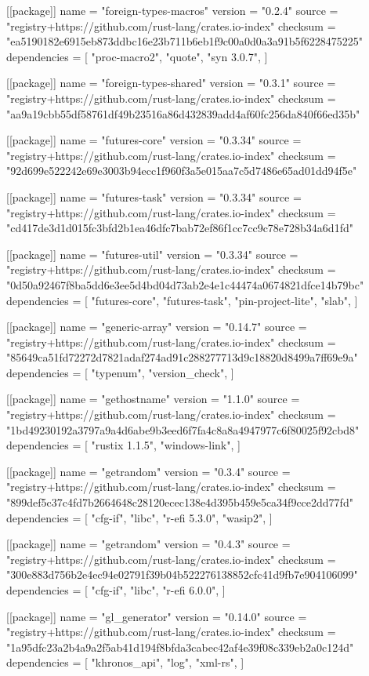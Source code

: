 [[package]]
name = "foreign-types-macros"
version = "0.2.4"
source = "registry+https://github.com/rust-lang/crates.io-index"
checksum = "ea5190182e6915eb873ddbc16e23b711b6eb1f9c00a0d0a3a91b5f6228475225"
dependencies = [
 "proc-macro2",
 "quote",
 "syn 3.0.7",
]

[[package]]
name = "foreign-types-shared"
version = "0.3.1"
source = "registry+https://github.com/rust-lang/crates.io-index"
checksum = "aa9a19cbb55df58761df49b23516a86d432839add4af60fc256da840f66ed35b"

[[package]]
name = "futures-core"
version = "0.3.34"
source = "registry+https://github.com/rust-lang/crates.io-index"
checksum = "92d699e522242e69e3003b94ecc1f960f3a5e015aa7c5d7486e65ad01dd94f5e"

[[package]]
name = "futures-task"
version = "0.3.34"
source = "registry+https://github.com/rust-lang/crates.io-index"
checksum = "cd417de3d1d015fc3bfd2b1ea46dfc7bab72ef86f1cc7cc9c78e728b34a6d1fd"

[[package]]
name = "futures-util"
version = "0.3.34"
source = "registry+https://github.com/rust-lang/crates.io-index"
checksum = "0d50a92467f8ba5dd6e3ee5d4bd04d73ab2e4e1c44474a0674821dfce14b79bc"
dependencies = [
 "futures-core",
 "futures-task",
 "pin-project-lite",
 "slab",
]

[[package]]
name = "generic-array"
version = "0.14.7"
source = "registry+https://github.com/rust-lang/crates.io-index"
checksum = "85649ca51fd72272d7821adaf274ad91c288277713d9c18820d8499a7ff69e9a"
dependencies = [
 "typenum",
 "version_check",
]

[[package]]
name = "gethostname"
version = "1.1.0"
source = "registry+https://github.com/rust-lang/crates.io-index"
checksum = "1bd49230192a3797a9a4d6abe9b3eed6f7fa4c8a8a4947977c6f80025f92cbd8"
dependencies = [
 "rustix 1.1.5",
 "windows-link",
]

[[package]]
name = "getrandom"
version = "0.3.4"
source = "registry+https://github.com/rust-lang/crates.io-index"
checksum = "899def5c37c4fd7b2664648c28120ecec138e4d395b459e5ca34f9cce2dd77fd"
dependencies = [
 "cfg-if",
 "libc",
 "r-efi 5.3.0",
 "wasip2",
]

[[package]]
name = "getrandom"
version = "0.4.3"
source = "registry+https://github.com/rust-lang/crates.io-index"
checksum = "300e883d756b2e4ec94e02791f39b04b522276138852cfc41d9fb7e904106099"
dependencies = [
 "cfg-if",
 "libc",
 "r-efi 6.0.0",
]

[[package]]
name = "gl_generator"
version = "0.14.0"
source = "registry+https://github.com/rust-lang/crates.io-index"
checksum = "1a95dfc23a2b4a9a2f5ab41d194f8bfda3cabec42af4e39f08c339eb2a0c124d"
dependencies = [
 "khronos_api",
 "log",
 "xml-rs",
]

